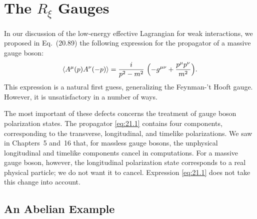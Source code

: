 \section{The $R_\xi$ Gauges}

In our discussion of the low-energy effective Lagrangian for weak
interactions, we proposed in Eq.~(20.89) the following expression for
the propagator of a massive gauge boson:
\begin{equation}
  \langle A^\mu(p)A^\nu(-p)\rangle = \frac{i}{p^2 - m^2}\ \Bigl(
    -g^{\mu\nu} + \frac{p^\mu p^\nu}{m^2} \Bigr) .
  \label{eq:21.1}
\end{equation}
This expression is a natural first guess, generalizing the Feynman-'t Hooft
gauge.  However, it is unsatisfactory in a number of ways.

The most important of these defects concerns the treatment of gauge boson
polarization states.  The propagator \eqref{eq:21.1} contains four components,
corresponding to the transverse, longitudinal, and timelike polarizations.
We saw in Chapters~5 and~16 that, for massless gauge bosons, the unphysical
longitudinal and timelike components cancel in computations.  For a massive
gauge boson, however, the longitudinal polarization state corresponds to a
real physical particle; we do not want it to cancel.  Expression \eqref{eq:21.1}
does not take this change into account.

\subsection{An Abelian Example}

